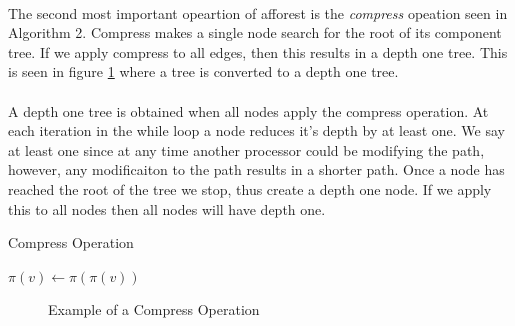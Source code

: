 \documentclass[]{article}
\begin{document}
\paragraph{}
The second most important opeartion of afforest is the \textit{compress} opeation seen in Algorithm 2.
Compress makes a single node search for the root of its component tree. If we apply compress to all edges, then this results in a depth one tree. This is seen in figure \ref{fig-compress} where a tree is converted to a depth one tree.

\paragraph{}
A depth one tree is obtained when all nodes apply the compress operation. At each iteration in the while loop a node reduces it's depth by at least one. We say at least one since at any time another processor could be modifying the path, however, any modificaiton to the path results in a shorter path. Once a node has reached the root of the tree we stop, thus create a depth one node. If we apply this to all nodes then all nodes will have depth one.
 
 
 \begin{algorithm}
\caption{Compress Operation}\label{euclid}
\begin{algorithmic}[1]
\State $\pi(v) \gets \pi(\pi(v))$
\EndWhile\label{euclidendwhile}
\EndProcedure
\end{algorithmic}
\end{algorithm}


\begin{figure}[H]%
    \centering
    \qquad
    \caption{Example of a Compress Operation}%
    \label{fig-compress}%
\end{figure}
 
\end{document}
